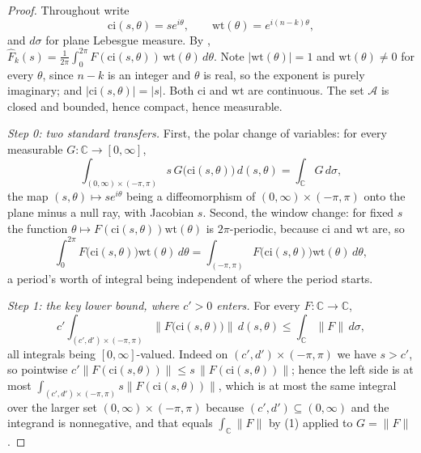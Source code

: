 \begin{proof}
Throughout write
\[
  \mathrm{ci}(s,\theta)=se^{i\theta},\qquad
  \mathrm{wt}(\theta)=e^{i(n-k)\theta},
\]
and $d\sigma$ for plane Lebesgue measure.  By ,
$\widehat F_k(s)=\frac1{2\pi}\int_0^{2\pi}F(\mathrm{ci}(s,\theta))\,
\mathrm{wt}(\theta)\,d\theta$.  Note $|\mathrm{wt}(\theta)|=1$ and
$\mathrm{wt}(\theta)\neq0$ for every $\theta$, since $n-k$ is an integer and
$\theta$ is real, so the exponent is purely imaginary; and
$|\mathrm{ci}(s,\theta)|=|s|$.  Both $\mathrm{ci}$ and $\mathrm{wt}$ are
continuous.  The set $\mathcal{A}$ is closed and bounded, hence compact, hence
measurable.

\emph{Step 0: two standard transfers.}  First, the polar change of variables:
for every measurable $G\colon\mathbb{C}\to[0,\infty]$,
\begin{equation}\tag{1}
  \int_{(0,\infty)\times(-\pi,\pi)}s\,G\bigl(\mathrm{ci}(s,\theta)\bigr)
    \,d(s,\theta)
  =\int_{\mathbb{C}}G\,d\sigma ,
\end{equation}
the map $(s,\theta)\mapsto se^{i\theta}$ being a diffeomorphism of
$(0,\infty)\times(-\pi,\pi)$ onto the plane minus a null ray, with Jacobian
$s$.  Second, the window change: for fixed $s$ the function
$\theta\mapsto F(\mathrm{ci}(s,\theta))\mathrm{wt}(\theta)$ is $2\pi$-periodic,
because $\mathrm{ci}$ and $\mathrm{wt}$ are, so
\begin{equation}\tag{2}
  \int_0^{2\pi}F\bigl(\mathrm{ci}(s,\theta)\bigr)\mathrm{wt}(\theta)\,d\theta
  =\int_{(-\pi,\pi)}F\bigl(\mathrm{ci}(s,\theta)\bigr)\mathrm{wt}(\theta)
    \,d\theta ,
\end{equation}
a period's worth of integral being independent of where the period starts.

\emph{Step 1: the key lower bound, where $c'>0$ enters.}  For every
$F\colon\mathbb{C}\to\mathbb{C}$,
\begin{equation}\tag{3}
  c'\int_{(c',d')\times(-\pi,\pi)}
      \bigl\|F\bigl(\mathrm{ci}(s,\theta)\bigr)\bigr\|\,d(s,\theta)
  \le\int_{\mathbb{C}}\|F\|\,d\sigma ,
\end{equation}
all integrals being $[0,\infty]$-valued.  Indeed on $(c',d')\times(-\pi,\pi)$
we have $s>c'$, so pointwise
$c'\|F(\mathrm{ci}(s,\theta))\|\le s\,\|F(\mathrm{ci}(s,\theta))\|$; hence
the left side is at most
$\int_{(c',d')\times(-\pi,\pi)}s\|F(\mathrm{ci}(s,\theta))\|$, which is at most
the same integral over the larger set $(0,\infty)\times(-\pi,\pi)$ because
$(c',d')\subseteq(0,\infty)$ and the integrand is nonnegative, and that equals
$\int_{\mathbb{C}}\|F\|$ by (1) applied to $G=\|F\|$.


\end{proof}
